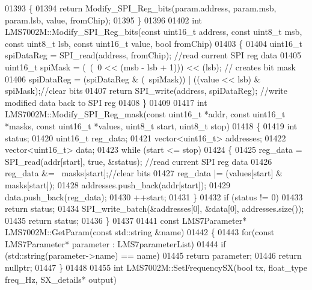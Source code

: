 \begin{DoxyCode}
{{{{{{{{{{{{{{{{{{{{{{{{{{{{{{{{{{{{{{{{{{01393 \{
01394     \textcolor{keywordflow}{return} Modify_SPI_Reg_bits(param.address, param.msb, param.lsb, value, fromChip);
01395 \}
01396 
01402 \textcolor{keywordtype}{int} LMS7002M::Modify_SPI_Reg_bits(\textcolor{keyword}{const} uint16\_t address, \textcolor{keyword}{const} uint8\_t msb, \textcolor{keyword}{const} uint8\_t lsb, \textcolor{keyword}{const} 
      uint16\_t value, \textcolor{keywordtype}{bool} fromChip)
01403 \{
01404     uint16\_t spiDataReg = SPI_read(address, fromChip); \textcolor{comment}{//read current SPI reg data}
01405     uint16\_t spiMask = (~(~0 << (msb - lsb + 1))) << (lsb); \textcolor{comment}{// creates bit mask}
01406     spiDataReg = (spiDataReg & (~spiMask)) | ((value << lsb) & spiMask);\textcolor{comment}{//clear bits}
01407     \textcolor{keywordflow}{return} SPI_write(address, spiDataReg); \textcolor{comment}{//write modified data back to SPI reg}
01408 \}
01409 
01417 \textcolor{keywordtype}{int} LMS7002M::Modify_SPI_Reg_mask(\textcolor{keyword}{const} uint16\_t *addr, \textcolor{keyword}{const} uint16\_t *masks, \textcolor{keyword}{const} uint16\_t *values, 
      uint8\_t start, uint8\_t stop)
01418 \{
01419     \textcolor{keywordtype}{int} status;
01420     uint16\_t reg\_data;
01421     vector<uint16\_t> addresses;
01422     vector<uint16\_t> data;
01423     \textcolor{keywordflow}{while} (start <= stop)
01424     \{
01425         reg\_data = SPI_read(addr[start], \textcolor{keyword}{true}, &status); \textcolor{comment}{//read current SPI reg data}
01426         reg\_data &= ~masks[start];\textcolor{comment}{//clear bits}
01427         reg\_data |= (values[start] & masks[start]);
01428         addresses.push\_back(addr[start]);
01429         data.push\_back(reg\_data);
01430         ++start;
01431     \}
01432     \textcolor{keywordflow}{if} (status != 0)
01433         \textcolor{keywordflow}{return} status;
01434     SPI_write_batch(&addresses[0], &data[0], addresses.size());
01435     \textcolor{keywordflow}{return} status;
01436 \}
01437 
01441 \textcolor{keyword}{const} LMS7Parameter* LMS7002M::GetParam(\textcolor{keyword}{const} std::string &name)
01442 \{
01443     \textcolor{keywordflow}{for}(\textcolor{keyword}{const} LMS7Parameter* parameter : LMS7parameterList)
01444         \textcolor{keywordflow}{if} (std::string(parameter->name) == name)
01445             \textcolor{keywordflow}{return} parameter;
01446     \textcolor{keywordflow}{return} \textcolor{keyword}{nullptr};
01447 \}
01448 
01455 \textcolor{keywordtype}{int} LMS7002M::SetFrequencySX(\textcolor{keywordtype}{bool} tx, float_type freq\_Hz, SX_details* output)
}}}}}}}}}}}}}}}}}}}}}}}}}}}}}}}}}}}}}}}}}}
\end{DoxyCode}
